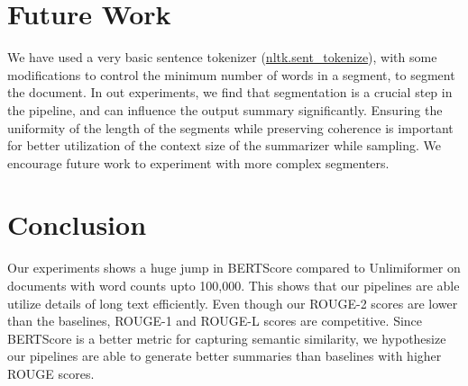 \section{Future Work}

We have used a very basic sentence tokenizer
(\href{https://www.nltk.org/api/nltk.tokenize.sent_tokenize.html}{nltk.sent\_tokenize}),
with some modifications to control the minimum number of words in a segment,
to segment the document.
In out experiments, we find that segmentation is a crucial step in the pipeline, and can
influence the output summary significantly.
Ensuring the uniformity of the length of the segments while preserving coherence is
important for better utilization of the context size of the summarizer while sampling.
We encourage future work to experiment with more complex segmenters.


\section{Conclusion}
\label{sec:conclusion}

Our experiments shows a huge jump in BERTScore compared to Unlimiformer on
documents with word counts upto 100,000.
This shows that our pipelines are able utilize details of long text efficiently.
Even though our ROUGE-2 scores are lower than the baselines, ROUGE-1 and ROUGE-L
scores are competitive.
Since BERTScore is a better metric for capturing semantic similarity, we hypothesize
our pipelines are able to generate better summaries than baselines with higher
ROUGE scores.
